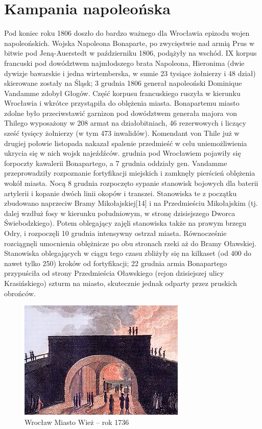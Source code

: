 \documentclass{article}
\begin{document}
\section{Kampania napoleońska}
Pod koniec roku 1806 doszło do bardzo ważnego dla Wrocławia epizodu wojen napoleońskich. Wojska Napoleona Bonaparte, po zwycięstwie nad armią Prus w bitwie pod Jeną-Auerstedt w październiku 1806, podążyły na wschód. IX korpus francuski pod dowództwem najmłodszego brata Napoleona, Hieronima (dwie dywizje bawarskie i jedna wirtemberska, w sumie 23 tysiące żołnierzy i 48 dział) skierowane zostały na Śląsk; 3 grudnia 1806 generał napoleoński Dominique Vandamme zdobył Głogów. Część korpusu francuskiego ruszyła w kierunku Wrocławia i wkrótce przystąpiła do oblężenia miasta. Bonapartemu miasto zdolne było przeciwstawić garnizon pod dowództwem generała majora von Thilego wyposażony w 208 armat na działobitniach, 46 rezerwowych i liczący sześć tysięcy żołnierzy (w tym 473 inwalidów). Komendant von Thile już w drugiej połowie listopada nakazał spalenie przedmieść w celu uniemożliwienia ukrycia się w nich wojsk najeźdźców.
\bigskip
{} grudnia pod Wrocławiem pojawiły się forpoczty kawalerii Bonapartego, a 7 grudnia oddziały gen. Vandamme przeprowadziły rozpoznanie fortyfikacji miejskich i zamknęły pierścień oblężenia wokół miasta. Nocą 8 grudnia rozpoczęto sypanie stanowisk bojowych dla baterii artylerii i kopanie dwóch linii okopów i transzei. Stanowiska te z początku zbudowano naprzeciw Bramy Mikołajskiej[14] i na Przedmieściu Mikołajskim (tj. dalej wzdłuż fosy w kierunku południowym, w stronę dzisiejszego Dworca Świebodzkiego). Potem oblegający zajęli stanowiska także na prawym brzegu Odry, i rozpoczęli 10 grudnia intensywny ostrzał miasta. Równocześnie rozciągnęli umocnienia oblężnicze po obu stronach rzeki aż do Bramy Oławskiej. Stanowiska oblegających w ciągu tego czasu zbliżyły się na kilkaset (od 400 do nawet tylko 250) kroków od fortyfikacji; 22 grudnia armia Bonapartego przypuściła od strony Przedmieścia Oławskiego (rejon dzisiejszej ulicy Krasińskiego) szturm na miasto, skutecznie jednak odparty przez pruskich obrońców.
\bigskip
\newline
\begin{figure}[h]
\centering
\includegraphics[scale=5]{6.jpg}
\caption{Wrocław Miasto Wież – rok 1736}
\end{figure}
\end{document}
